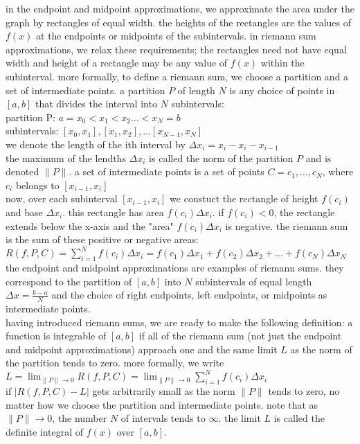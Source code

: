 \documentclass{article}
\begin{document}
in the endpoint and midpoint approximations, we approximate the area under the graph by rectangles of equal width. the heights of the rectangles are the values of $f(x)$ at the endpoints or midpoints of the subintervals. in riemann sum approximations, we relax these requirements; the rectangles need not have equal width and height of a rectangle may be any value of $f(x)$ within the subinterval. more formally, to define a riemann sum, we choose a partition and a set of intermediate points. a partition $P$ of length $N$ is any choice of points in $[a, b]$ that divides the interval into $N$ subintervals:\\
partition P: $a = x_0 < x_1 < x_2 \ldots < x_N = b$\\
subintervals: $[x_0, x_1], [x_1, x_2], \ldots [x_{N-1}, x_{N}]$\\
we denote the length of the ith interval by $\Delta x_i = x_i - x_i - x_{i-1}$\\
the maximum of the lendths $\Delta x_i$ is called the norm of the partition $P$ and is denoted $\lVert P\rVert$. a set of intermediate points is a set of points $C = {c_1, \ldots, c_N}$, where $c_i$ belongs to $[x_{i-1}, x_i]$\\

now, over each subinterval $[x_{i-1}, x_i]$ we constuct the rectangle of height $f(c_i)$ and base $\Delta x_i$. this rectangle has area $f(c_i)\Delta x_i$. if $f(c_i) < 0$, the rectangle extends below the x-axis and the "area" $f(c_i)\Delta x_i$ is negative. the riemann sum is the sum of these positive or negative areas: $R(f, P, C) = \sum_{i=1}^{N}f(c_i)\Delta x_i = f(c_1)\Delta x_1 + f(c_2)\Delta x_2 + \ldots + f(c_N)\Delta x_N$\\

the endpoint and midpoint approximations are examples of riemann sums. they correspond to the partition of $[a, b]$ into $N$ subintervals of equal length $\Delta x = \frac{b - a}{N}$ and the choice of right endpoints, left endpoints, or midpoints as intermediate points.\\

having introduced riemann sums, we are ready to make the following definition: a function is integrable of $[a, b]$ if all of the riemann sum (not just the endpoint and midpoint approximations) approach one and the same limit $L$ as the norm of the partition tends to zero. more formally, we write\\
$L = \lim_{\lVert P\rVert \to 0}R(f, P, C) = \lim_{\lVert P\rVert \to 0}\sum_{i=1}^{N}f(c_i)\Delta x_i$\\
if $\lvert R(f, P, C) - L\rvert$ gets arbitrarily small as the norm $\lVert P\rVert$ tends to zero, no matter how we choose the partition and intermediate points. note that as $\lVert P\rVert \to 0$, the number $N$ of intervals tends to $\infty$. the limit $L$ is called the definite integral of $f(x)$ over $[a, b]$.\\
\end{document}
